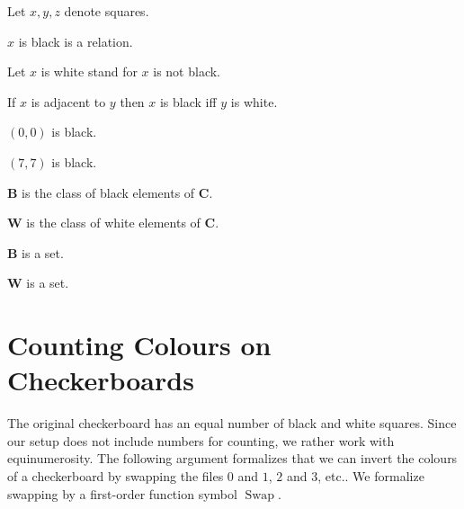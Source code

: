 \documentclass{article}
\newcommand{\Checkerboard}{\mathbf{C}}
\newcommand{\Black}{\mathbf{B}}
\newcommand{\White}{\mathbf{W}}
\newcommand{\Swap}[1]{\operatorname{Swap}#1}
\begin{document}
\begin{forthel}
    Let $x, y, z$ denote squares.

    \begin{signature} $x$ is black is a relation. \end{signature}
    Let $x$ is white stand for $x$ is not black.

    \begin{axiom} If $x$ is adjacent to $y$ then $x$ is black iff $y$ is white. \end{axiom}

    \begin{axiom} $(0,0)$ is black. \end{axiom}
    \begin{axiom} $(7,7)$ is black. \end{axiom}

    \begin{definition} $\Black$ is the class of black elements of $\Checkerboard$. \end{definition}
    \begin{definition} $\White$ is the class of white elements of $\Checkerboard$. \end{definition}

    \begin{lemma} $\Black$ is a set. \end{lemma}
    \begin{lemma} $\White$ is a set. \end{lemma}
\end{forthel}


\section{Counting Colours on Checkerboards}

The original checkerboard has an equal number of black and white squares.
Since our setup does not include numbers for counting, we rather work with
equinumerosity. The following argument formalizes that we can invert the
colours of a checkerboard by swapping the files $0$ and $1$, $2$ and $3$, etc..
We formalize swapping by a first-order function symbol $\Swap{}$.
\end{document}
